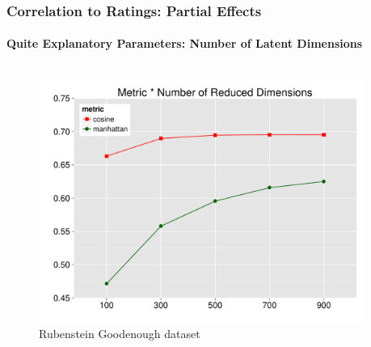 \documentclass[t]{beamer} %
\begin{document}
\begin{frame}
  \frametitle{Correlation to Ratings: Partial Effects}
  \framesubtitle{Quite Explanatory Parameters:  Number of Latent Dimensions} 
  
  \vspace{-18pt}
  
  \begin{columns}
    
    \begin{column}{0.5\textwidth}
      \begin{figure} 
        \hspace*{-18pt} 
        \includegraphics[scale=0.30]{img/lapesa_rg_main_metric_n-dim}
        \vspace{-10pt}
        \caption{Rubenstein Goodenough dataset}
      \end{figure}
    \end{column}


    \begin{column}{0.5\textwidth}
      \centering
      

\end{column}
\end{columns}
\end{frame}
\end{document}
